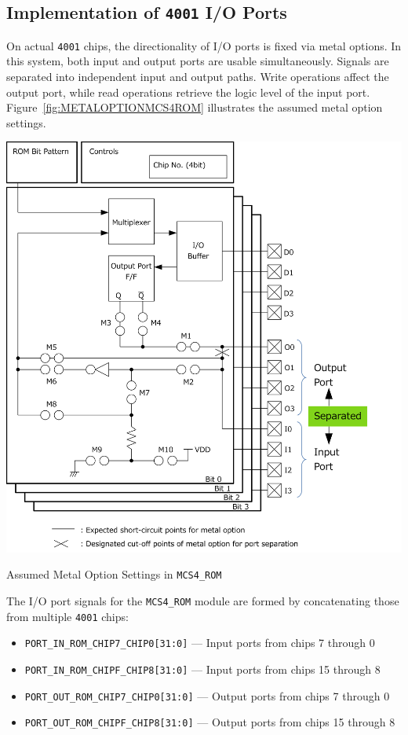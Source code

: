 \subsection{\textbf{Implementation of \texttt{4001} I/O Ports}}
On actual \texttt{4001} chips, the directionality of I/O ports is fixed via metal options.  
In this system, both input and output ports are usable simultaneously.  
Signals are separated into independent input and output paths.  
Write operations affect the output port, while read operations retrieve the logic level of the input port.  
Figure~\ref{fig:METALOPTIONMCS4ROM} illustrates the assumed metal option settings.

\begin{table}[htbp]
    \includegraphics[width=0.66\columnwidth]{./Figure/MCS4ROMMetalOption.png}
    \caption{Assumed Metal Option Settings in \texttt{MCS4\_ROM}}
    \label{fig:METALOPTIONMCS4ROM}
\end{table}

The I/O port signals for the \texttt{MCS4\_ROM} module are formed by concatenating those from multiple \texttt{4001} chips:

\begin{itemize}
  \item \verb|PORT_IN_ROM_CHIP7_CHIP0[31:0]| — Input ports from chips 7 through 0
  \item \verb|PORT_IN_ROM_CHIPF_CHIP8[31:0]| — Input ports from chips 15 through 8
  \item \verb|PORT_OUT_ROM_CHIP7_CHIP0[31:0]| — Output ports from chips 7 through 0
  \item \verb|PORT_OUT_ROM_CHIPF_CHIP8[31:0]| — Output ports from chips 15 through 8
\end{itemize}

